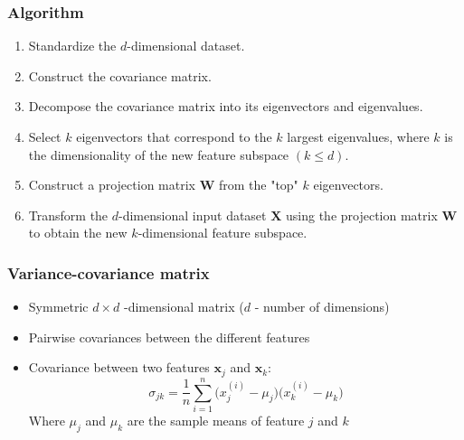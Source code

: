 \documentclass{beamer}
\begin{document}
\begin{frame}
  \frametitle{Algorithm}
  \begin{enumerate}
  \item Standardize the $d$-dimensional dataset.
  \item Construct the covariance matrix.
  \item Decompose the covariance matrix into its eigenvectors and eigenvalues.
  \item Select $k$ eigenvectors that correspond to the $k$ largest eigenvalues, where $k$ is the dimensionality of the new feature subspace $(k \le d)$.
  \item Construct a projection matrix $\mathbf{W}$ from the "top" $k$ eigenvectors.
  \item Transform the $d$-dimensional input dataset $\mathbf{X}$ using the projection matrix $\mathbf{W}$ to obtain the new $k$-dimensional feature subspace.
  \end{enumerate}
\end{frame}

\begin{frame}
  \frametitle{Variance-covariance matrix}
  \begin{itemize}
  \item Symmetric $d \times d$ -dimensional matrix ($d$ - number of dimensions)
  \item Pairwise covariances between the different features
  \item Covariance between two features $\mathbf{x}_j$ and $\mathbf{x}_k$:
    \[
    \sigma_{jk} = \frac{1}{n} \sum_{i=1}^{n} \big(  x_{j}^{(i)} - \mu_j  \big) \big(  x_{k}^{(i)}  - \mu_k \big)
    \]
    Where $\mu_j$ and $\mu_k$ are the sample means of feature $j$ and $k$
  \end{itemize}

\end{frame}
\end{document}
